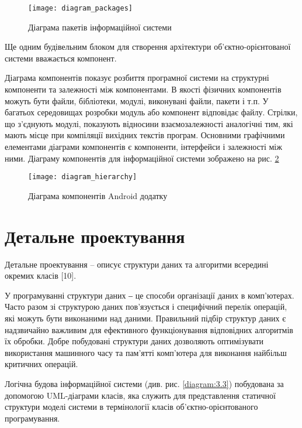 \documentclass[../main.tex]{subfiles}
\begin{document}

\begin{figure}[H]
	\centering
	\texttt{[image: diagram\_packages]}
	\caption{Діаграма пакетів інформаційної системи}
	\label{diagram:3.1}
\end{figure}

Ще одним будівельним блоком для створення архітектури об'єктно-орієнтованої системи вважається компонент. \cite{diploma_guidelines}

Діаграма компонентів показує розбиття програмної системи на структурні компоненти та залежності між компонентами. В якості фізичних компонентів можуть бути файли, бібліотеки, модулі, виконувані файли, пакети і т.п. У багатьох середовищах розробки модуль або компонент відповідає файлу. Стрілки, що з'єднують модулі, показують відносини взаємозалежності аналогічні тим, які мають місце при компіляції вихідних текстів програм. Основними графічними елементами діаграми компонентів є компоненти, інтерфейси і залежності між ними. Діаграму компонентів для інформаційної системи зображено на рис. \ref{diagram:3.2}


\begin{figure}[H]
	\centering
	\texttt{[image: diagram\_hierarchy]}
	\caption{Діаграма компонентів Android додатку}
	\label{diagram:3.2}
\end{figure}

\section{Детальне проектування}

Детальне проектування – описує структури даних та алгоритми всередині окремих класів [10]. 

У програмуванні структури даних ‒ це способи організації даних в комп’ютерах. Часто разом зі структурою даних пов’язується і специфічний перелік операцій, які можуть бути виконаними над даними.
Правильний підбір структур даних є надзвичайно важливим для ефективного функціонування відповідних алгоритмів їх обробки. Добре побудовані структури даних дозволяють оптимізувати використання машинного часу та пам’ятті комп’ютера для виконання найбільш критичних операцій.

Логічна будова інформаційної системи (див. рис. \ref{diagram:3.3}) побудована  за допомогою UML-діаграми класів, яка служить для представлення статичної структури моделі системи в термінології класів об’єктно-орієнтованого програмування.
\end{document}
